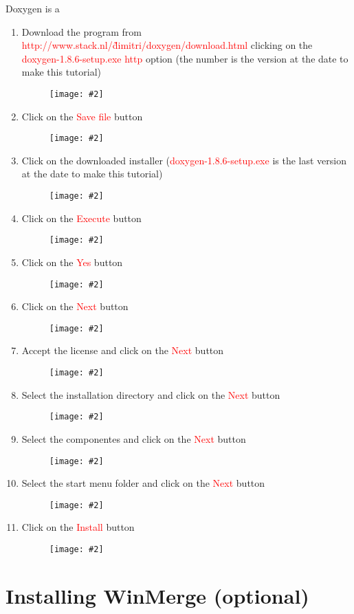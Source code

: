 \documentclass[a4paper]{article}
\newcommand{\FIG}[2]
{
	\begin{figure}[ht!]
	\centering
	\texttt{[image: \#2]}
	\end{figure}
}
\newcommand{\FIGURE}[1]{\FIG{0.35}{#1}}
\newcommand{\RED}[1] {\textcolor{red}{#1}}
\begin{document}
Doxygen is a

\begin{enumerate}

\item Download the program from
\RED{http://www.stack.nl/\~dimitri/doxygen/download.html} clicking
on the \RED{doxygen-1.8.6-setup.exe http} option (the number is the version at
the date to make this tutorial)
\FIGURE{doxygen-1.png.eps}

\clearpage

\item Click on the \RED{Save file} button
\FIGURE{doxygen-2.png.eps}

\item Click on the downloaded installer (\RED{doxygen-1.8.6-setup.exe} is the
last version at the date to make this tutorial)
\FIGURE{doxygen-3.png.eps}

\clearpage

\item Click on the \RED{Execute} button
\FIGURE{doxygen-4.png.eps}

\item Click on the \RED{Yes} button
\FIGURE{doxygen-5.png.eps}

\clearpage

\item Click on the \RED{Next} button
\FIGURE{doxygen-6.png.eps}

\item Accept the license and click on the \RED{Next} button
\FIGURE{doxygen-7.png.eps}

\clearpage

\item Select the installation directory and click on the \RED{Next} button
\FIGURE{doxygen-8.png.eps}

\item Select the componentes and click on the \RED{Next} button
\FIGURE{doxygen-9.png.eps}

\clearpage

\item Select the start menu folder and click on the \RED{Next} button
\FIGURE{doxygen-10.png.eps}

\item Click on the \RED{Install} button
\FIGURE{doxygen-11.png.eps}

\end{enumerate}

\clearpage

\section{Installing WinMerge (optional)}
\end{document}
